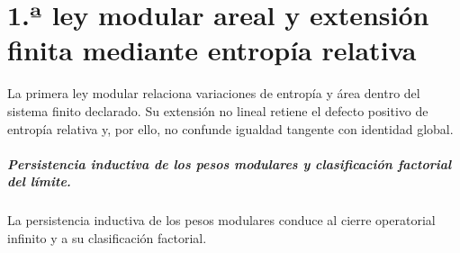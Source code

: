 \chapter{1.ª ley modular areal y extensión finita mediante entropía relativa}
\label{chap:parte-iv-61}

La primera ley modular relaciona variaciones de entropía y área dentro del sistema finito declarado. Su extensión no lineal retiene el defecto positivo de entropía relativa y, por ello, no confunde igualdad tangente con identidad global.



\paragraph{Persistencia inductiva de los pesos modulares y clasificación factorial del límite.} La persistencia inductiva de los pesos modulares conduce al cierre operatorial infinito y a su clasificación factorial.
